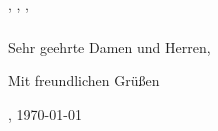 \documentclass[USenglish,ngerman]{article} %
\title{}
\author{\sendname{} \sendsurname{}}
\date{\today}
\newcommand{\sendsurname}{}
\newcommand{\sendname}{}
\newcommand{\sendstreet}{}
\newcommand{\sendzip}{}
\newcommand{\sendcity}{}
\newcommand{\sendcountry}{}
\newcommand{\sendemail}{}
\newcommand{\sendphone}{}
\newcommand{\recsurname}{}
\newcommand{\recname}{}
\newcommand{\recspecial}{}
\newcommand{\recstreet}{}
\newcommand{\reczip}{}
\newcommand{\reccity}{}
\newcommand{\reccountry}{}
\begin{document}
\begin{flushright}
  \textbf{\sendname{} \sendsurname{}}\break{}
  \sendstreet{}\break{}
  \sendzip{} \sendcity{}\break{}
  \sendcountry{}\break{}
  \sendemail{}\break{}
  \sendphone{}%
\end{flushright}

\bigskip

{\scriptsize \sendname{} \sendsurname{}, \sendstreet{}, \sendzip{} \sendcity{}, \sendcountry{}}
\bigskip\newline{}
\textbf{\recname{} \recsurname{}}\newline{}
\recspecial{}\newline{}
\recstreet{}\newline{}
\reczip{} \reccity{}\newline{}
\reccountry{}

\bigskip

\begin{flushright}
  \thedate{}
\end{flushright}

\subsubsection*{\thetitle}


\bigskip
Sehr geehrte Damen und Herren,
\bigskip


\bigskip
Mit freundlichen Grüßen
\bigskip


\bigskip
\makebox[2.5in]{\hrulefill}\newline{}
\small\sendcity{}, \today{} \\
\end{document}
